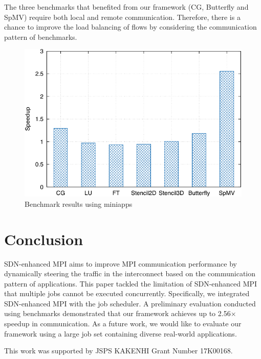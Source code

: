 \documentclass[graybox]{svmult}
\begin{document}
The three benchmarks that benefited from our framework (CG, Butterfly and
SpMV) require both local and remote communication. Therefore, there is a
chance to improve the load balancing of flows by considering the communication
pattern of benchmarks.

\begin{figure}
    \centering
    \includegraphics{benchmark_result}
    \caption{Benchmark results using miniapps}%
    \label{kt:fig:benchmark}
\end{figure}

\section{Conclusion}\label{kt:sec:v}

SDN-enhanced MPI aims to improve MPI communication performance by dynamically
steering the traffic in the interconnect based on the communication pattern of
applications. This paper tackled the limitation of SDN-enhanced MPI that
multiple jobs cannot be executed concurrently. Specifically, we integrated
SDN-enhanced MPI with the job scheduler. A preliminary evaluation conducted
using benchmarks demonstrated that our framework achieves up to 2.56$\times$
speedup in communication. As a future work, we would like to evaluate our
framework using a large job set containing diverse real-world applications.

\begin{acknowledgement}
This work was supported by JSPS KAKENHI Grant Number 17K00168.
\end{acknowledgement}



\end{document}
